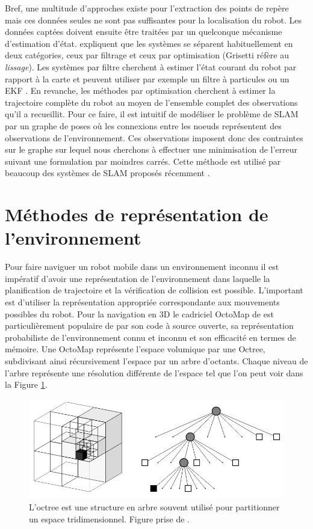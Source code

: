 Bref, une multitude d'approches existe pour l'extraction des points de repère mais ces données seules ne sont pas suffisantes pour la localisation du robot. Les données captées doivent ensuite être traitées par un quelconque mécanisme d'estimation d'état. \cite{Grisetti2010} expliquent que les systèmes se séparent habituellement en deux catégories, ceux par filtrage et ceux par optimisation (Grisetti réfère au \textit{lissage}). Les systèmes par filtre cherchent à estimer l'état courant du robot par rapport à la carte et peuvent utiliser par exemple un filtre à particules \citep{Grisetti2007} ou un EKF \citep{Montemerlo03a}. En revanche, les méthodes par optimisation cherchent à estimer la trajectoire complète du robot au moyen de l'ensemble complet des observations qu'il a recueillit. Pour ce faire, il est intuitif de modéliser le problème de SLAM par un graphe de poses où les connexions entre les noeuds représentent des observations de l'environnement. Ces observations imposent donc des contraintes sur le graphe sur lequel nous cherchons à effectuer une minimisation de l'erreur suivant une formulation par moindres carrés. Cette méthode est utilisé par beaucoup des systèmes de SLAM proposés récemment \citep{Labbe2014, Hess2016}.

\section{Méthodes de représentation de l'environnement}\label{subsec:representations}

Pour faire naviguer un robot mobile dans un environnement inconnu il est impératif d'avoir une représentation de l'environnement dans laquelle la planification de trajectoire et la vérification de collision est possible. L'important est d'utiliser la représentation appropriée correspondante aux mouvements possibles du robot. Pour la navigation en 3D le cadriciel OctoMap de \cite{Hornung2013} est particulièrement populaire de par son code à source ouverte, sa représentation probabiliste de l'environnement connu et inconnu et son efficacité en termes de mémoire. Une OctoMap représente l'espace volumique par une Octree, subdivisant ainsi récursivement l'espace par un arbre d'octants. Chaque niveau de l'arbre représente une résolution différente de l'espace tel que l'on peut voir dans la Figure \ref{fig:octree}.

\begin{figure}[h]
  \centering
  \includegraphics[width=0.5\linewidth]{images/octree.jpg}
  \caption[Représentation graphique d'une Octree]{L'octree est une structure en arbre souvent utilisé pour partitionner un espace tridimensionnel. Figure prise de \citep{Hornung2013}.}
  \label{fig:octree}
\end{figure}

